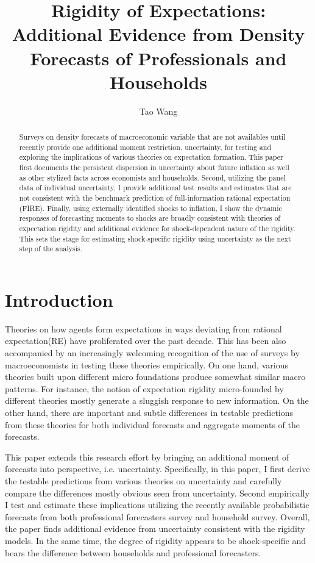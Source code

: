 \documentclass[12pt]{article}
\title{Rigidity of Expectations: Additional Evidence from Density Forecasts of Professionals and Households}
\author{Tao Wang}
\begin{document}
	
	\maketitle
	
	\begin{abstract}
		Surveys on density forecasts of macroeconomic variable that are not availables until recently provide one additional moment restriction, uncertainty, for testing and exploring the implications of various theories on expectation formation. This paper first documents the persistent dispersion in uncertainty about future inflation as well as other stylized facts across economists and households.  Second,  utilizing the panel data of individual uncertainty, I provide additional test results and estimates that are not consistent with the benchmark prediction of full-information rational expectation (FIRE). Finally, using externally identified shocks to inflation, I show the dynamic responses of forecasting moments to shocks are broadly consistent with theories of expectation rigidity and additional evidence for shock-dependent nature of the rigidity.  This sets the stage for estimating shock-specific rigidity using uncertainty as the next step of the analysis.  
		
	\end{abstract}
	
	\newpage 
	
	\section{Introduction}
	
	
	Theories on how agents form expectations in ways deviating from rational expectation(RE) have proliferated over the past decade. This has been also accompanied by an increasingly welcoming recognition of the use of surveys by macroeconomists in testing these theories empirically.  On one hand, various theories built upon different micro foundations produce somewhat similar macro patterns. For instance, the notion of expectation rigidity micro-founded by different theories mostly generate a sluggish response to new information.  On the other hand, there are important and subtle differences in testable predictions from these theories for both individual forecasts and aggregate moments of the forecasts. 
	
	This paper extends this research effort by bringing an additional moment of forecasts into perspective, i.e. uncertainty. Specifically, in this paper, I first derive the testable predictions from various theories on uncertainty and carefully compare the differences mostly obvious seen from uncertainty. Second empirically I test and estimate these implications utilizing the recently available probabilistic forecasts from both professional forecasters survey and household survey. Overall, the paper finds additional evidence from uncertainty consistent with the rigidity models. In the same time, the degree of rigidity appears to be shock-specific and bears the difference between households and professional forecasters. 
	
\end{document}
